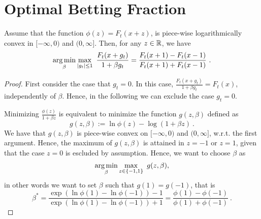 \section{Optimal Betting Fraction}
\label{section:optimal-betting-fraction}

\begin{theorem}
\label{theo:opt_beta}
Assume that the function $\phi(z)=F_t(x+z)$, is piece-wise logarithmically convex in $[-\infty,0)$ and $(0,\infty]$. Then, for any $z\in \mathbb{R}$, we have
\[
\argmin_{\beta} \max_{|g_t|\leq 1} \ \frac{F_t(x+g_t)}{1 + \beta g_t} =\frac{F_t(x+1) - F_t(x-1)}{F_t(x+1) + F_t(x-1)}~.
\]
\end{theorem}
\begin{proof}
First consider the case that $g_t=0$. In this case, $\frac{F_t(x+g_t)}{1 + \beta g_t}=F_t(x)$, independently of $\beta$. Hence, in the following we can exclude the case $g_t=0$.

Minimizing $\frac{\phi(z)}{1+\beta z}$ is equivalent to minimize the function $g(z,\beta)$ defined as
\[
g(z,\beta) := \ln \phi(z) - \log(1+\beta z)~.
\]
We have that $g(z,\beta)$ is piece-wise convex on $[-\infty,0)$ and $(0,\infty]$, w.r.t. the first argument.
Hence, the maximum of $g(z,\beta)$ is attained in $z=-1$ or $z=1$, given that the case $z=0$ is escluded by assumption.
Hence, we want to choose $\beta$ as
\[
\argmin_{\beta} \max_{z \in \{-1, 1\}} \ g(z,\beta),
\]
in other words we want to set $\beta$ such that $g(1)=g(-1)$, that is
\[
\beta^* = \frac{\exp\left(\ln \phi(1) - \ln \phi(-1)\right)-1}{\exp\left(\ln \phi(1) - \ln \phi(-1)\right)+1}
= \frac{\phi(1) - \phi(-1)}{\phi(1) + \phi(-1)}~.
\]
\end{proof}
